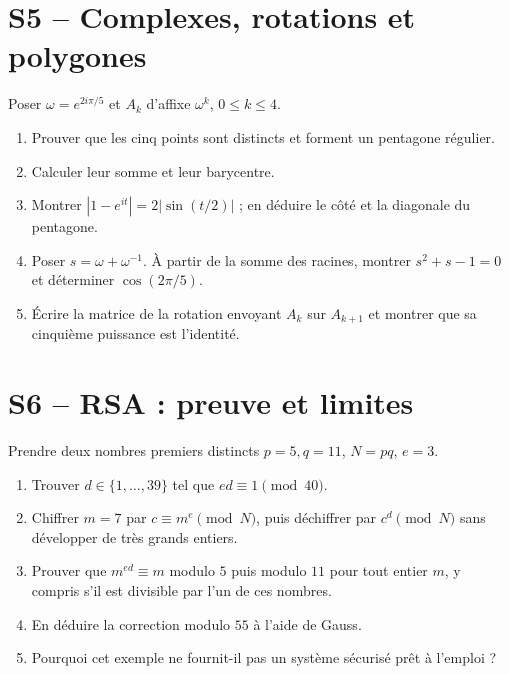 \section{S5 -- Complexes, rotations et polygones}
Poser $\omega=e^{2i\pi/5}$ et $A_k$ d'affixe $\omega^k$, $0\le k\le4$.
\begin{enumerate}
\item Prouver que les cinq points sont distincts et forment un pentagone régulier.
\item Calculer leur somme et leur barycentre.
\item Montrer $|1-e^{it}|=2|\sin(t/2)|$ ; en déduire le côté et la diagonale du pentagone.
\item Poser $s=\omega+\omega^{-1}$. À partir de la somme des racines, montrer $s^2+s-1=0$ et déterminer $\cos(2\pi/5)$.
\item Écrire la matrice de la rotation envoyant $A_k$ sur $A_{k+1}$ et montrer que sa cinquième puissance est l'identité.
\end{enumerate}

\section{S6 -- RSA : preuve et limites}
Prendre deux nombres premiers distincts $p=5,q=11$, $N=pq$, $e=3$.
\begin{enumerate}
\item Trouver $d\in\{1,\ldots,39\}$ tel que $ed\equiv1\pmod{40}$.
\item Chiffrer $m=7$ par $c\equiv m^e\pmod N$, puis déchiffrer par $c^d\pmod N$ sans développer de très grands entiers.
\item Prouver que $m^{ed}\equiv m$ modulo $5$ puis modulo $11$ pour tout entier $m$, y compris s'il est divisible par l'un de ces nombres.
\item En déduire la correction modulo $55$ à l'aide de Gauss.
\item Pourquoi cet exemple ne fournit-il pas un système sécurisé prêt à l'emploi ?
\end{enumerate}

